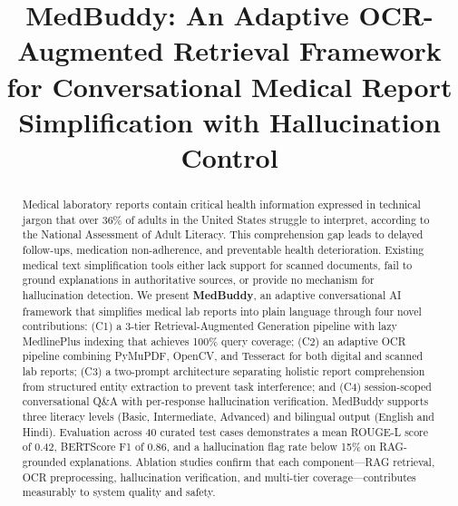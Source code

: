 \documentclass[conference]{IEEEtran}
\begin{document}
\title{MedBuddy: An Adaptive OCR-Augmented Retrieval Framework for Conversational Medical Report Simplification with Hallucination Control}

\author{
}

\maketitle

\begin{abstract}
Medical laboratory reports contain critical health information expressed in technical jargon that over 36\% of adults in the United States struggle to interpret, according to the National Assessment of Adult Literacy. This comprehension gap leads to delayed follow-ups, medication non-adherence, and preventable health deterioration. Existing medical text simplification tools either lack support for scanned documents, fail to ground explanations in authoritative sources, or provide no mechanism for hallucination detection. We present \textbf{MedBuddy}, an adaptive conversational AI framework that simplifies medical lab reports into plain language through four novel contributions: (C1) a 3-tier Retrieval-Augmented Generation pipeline with lazy MedlinePlus indexing that achieves 100\% query coverage; (C2) an adaptive OCR pipeline combining PyMuPDF, OpenCV, and Tesseract for both digital and scanned lab reports; (C3) a two-prompt architecture separating holistic report comprehension from structured entity extraction to prevent task interference; and (C4) session-scoped conversational Q\&A with per-response hallucination verification. MedBuddy supports three literacy levels (Basic, Intermediate, Advanced) and bilingual output (English and Hindi). Evaluation across 40 curated test cases demonstrates a mean ROUGE-L score of 0.42, BERTScore F1 of 0.86, and a hallucination flag rate below 15\% on RAG-grounded explanations. Ablation studies confirm that each component---RAG retrieval, OCR preprocessing, hallucination verification, and multi-tier coverage---contributes measurably to system quality and safety.
\end{abstract}
\end{document}
